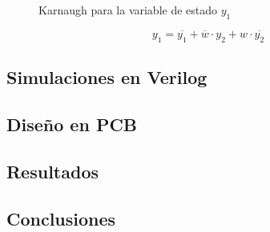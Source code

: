 \begin{figure}[H]
    \centering
    \begin{Karnaughvuit}
    \end{Karnaughvuit}
    \caption{Karnaugh para la variable de estado $y_1$}
\end{figure}

\begin{equation}
    y_1 = \overline{y_1} + \overline{w} \cdot y_2 + w \cdot \overline{y_2}
\end{equation}

\subsection{Simulaciones en Verilog}
\subsection{Dise\~no en PCB}
\subsection{Resultados}
\subsection{Conclusiones}